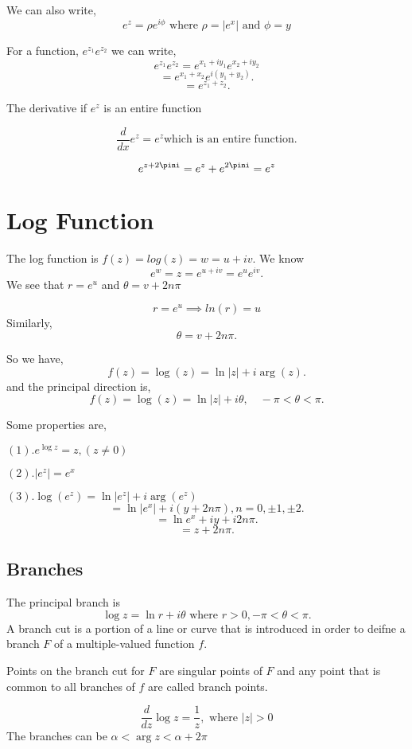 We can also write, $$e^z = \rho e^{i \phi} \text{ where } \rho = |e^x| \text{ and } \phi = y$$ 

For a function, $e^{z_1}e^{z_2}$ we can write, 
$$e^{z_1}e^{z_2} = e^{x_1 + iy_1}e^{x_2+iy_2}$$
\[
=e^{x_1 + x_2} e^{i(y_1+y_2)}
.\] 
\[
   =e^{z_1+z_2}
.\] 



The derivative if $e^z$ is an entire function

$$\frac{d}{dx} e^z = e^z \text{which is an entire function.}$$

$$e^{z + 2\pini} = e^z + e^{2\pini} = e^z$$

\section{Log Function}
The log function is $f(z) = log(z) = w = u + iv$. We know \[
   e^w = z = e^{u + iv} = e^u e^{iv}
.\] 
We see that $r = e^u$ and $\theta = v + 2n\pi$

$$r = e^u \implies ln(r) = u$$
Similarly, \[
\theta = v + 2n\pi
.\] 

So we have, \[
f(z) = \log(z) = \ln|z| + i\arg(z)
.\] 
and the principal direction is, \[
f(z) = \log(z) = \ln|z| + i\theta, \quad -\pi < \theta < \pi
.\] 



Some properties are, 

   $(1). e^{\log z} = z, (z \neq 0)$

   $(2). |e^z| = e^x$
   
   $(3). \log(e^z) = \ln|e^z| + i\arg(e^z)$
\[
= \ln|e^x| + i(y + 2n\pi), n = 0, \pm 1, \pm 2
.\] 
\[
= \ln e^x + iy + i 2 n \pi
.\] 
\[
= z + 2n\pi
.\] 

\subsection*{Branches}
The principal branch is \[
   \log z = \ln r + i \theta \text{ where } r > 0, -\pi < \theta < \pi
.\] 
A branch cut is a portion of a line or curve that is introduced in order to deifne a branch $F$ of a multiple-valued function $f$.

Points on the branch cut for $F$ are singular points of $F$ and any point that is common to all branches of $f$ are called branch points.

\begin{eg}
   \[
      \frac{d}{dz} \log z = \frac{1}{z}, \text{ where } |z | > 0
\]
The branches can be $\alpha < \arg z < \alpha + 2\pi$
\end{eg}



